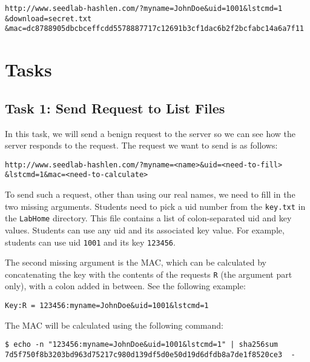 \begin{lstlisting}
http://www.seedlab-hashlen.com/?myname=JohnDoe&uid=1001&lstcmd=1
&download=secret.txt
&mac=dc8788905dbcbceffcdd5578887717c12691b3cf1dac6b2f2bcfabc14a6a7f11
\end{lstlisting}



\section{Tasks}


\subsection{Task 1: Send Request to List Files}

In this task, we will send a benign request to the server so we
can see how the server responds to the request. The request we want to send
is as follows:

\begin{lstlisting}
http://www.seedlab-hashlen.com/?myname=<name>&uid=<need-to-fill>
&lstcmd=1&mac=<need-to-calculate>
\end{lstlisting}

To send such a request, other than using our real names, we need to fill in the
two missing arguments. Students need
to pick a uid number from the \texttt{key.txt} in the \texttt{LabHome}
directory. This file contains a list of colon-separated uid and key values. Students
can use any uid and its associated key value. For example, students can use uid
\texttt{1001} and its key \texttt{123456}.

The second missing argument is the MAC, which can be calculated by
concatenating the key with the contents of the requests \texttt{R}
(the argument part only), with a colon added in between.
See the following example:

\begin{lstlisting}
Key:R = 123456:myname=JohnDoe&uid=1001&lstcmd=1
\end{lstlisting}

The MAC will be calculated using the following command:

\begin{lstlisting}
$ echo -n "123456:myname=JohnDoe&uid=1001&lstcmd=1" | sha256sum
7d5f750f8b3203bd963d75217c980d139df5d0e50d19d6dfdb8a7de1f8520ce3  -
\end{lstlisting}

